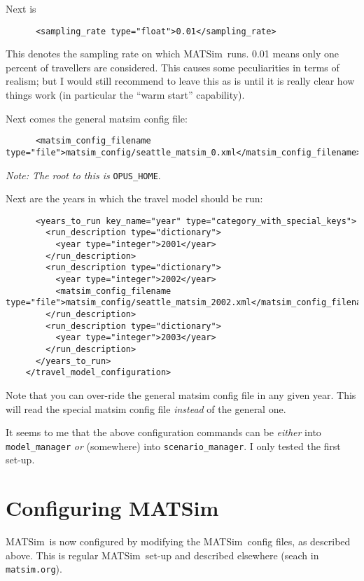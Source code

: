 \documentclass{article}
\def\matsim{MATSim}
\begin{document}
Next is
\begin{verbatim}
      <sampling_rate type="float">0.01</sampling_rate>
\end{verbatim}
This denotes the sampling rate on which \matsim\ runs.  0.01 means
only one percent of travellers are considered.  This causes some
peculiarities in terms of realism; but I would still recommend to
leave this as is until it is really clear how things work (in
particular the ``warm start'' capability).

Next comes the general matsim config file:
{\footnotesize
\begin{verbatim}
      <matsim_config_filename type="file">matsim_config/seattle_matsim_0.xml</matsim_config_filename>
\end{verbatim}
}
\emph{Note: The root to this is} \verb$OPUS_HOME$.

Next are the years in which the travel model should be run:
{\footnotesize
\begin{verbatim}
      <years_to_run key_name="year" type="category_with_special_keys">
        <run_description type="dictionary">
          <year type="integer">2001</year>
        </run_description>
        <run_description type="dictionary">
          <year type="integer">2002</year>
          <matsim_config_filename type="file">matsim_config/seattle_matsim_2002.xml</matsim_config_filename>
        </run_description>
        <run_description type="dictionary">
          <year type="integer">2003</year>
        </run_description>
      </years_to_run>
    </travel_model_configuration>
\end{verbatim}
}
Note that you can over-ride the general matsim config file in any given
year.  This will read the special matsim config file \emph{instead} of
the general one.

It seems to me that the above configuration commands can be
\emph{either} into \verb$model_manager$ \emph{or} (somewhere) into
\verb$scenario_manager$.  I only tested the first set-up.


\section{Configuring \matsim}

\matsim\ is now configured by modifying the \matsim\ config files, as
described above.  This is regular \matsim\ set-up and described
elsewhere (seach in \verb$matsim.org$).  
\end{document}
